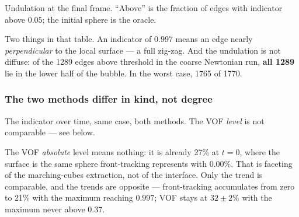 \begin{table}[htbp]
\centering
\caption{Undulation at the final frame. ``Above'' is the fraction of edges with
indicator above $0.05$; the initial sphere is the oracle.}
\label{tab:undulation}
\small
\begin{adjustbox}{max width=\linewidth}
\end{adjustbox}
\end{table}

Two things in that table. An indicator of $0.997$ means an edge nearly
\emph{perpendicular} to the local surface --- a full zig-zag. And the undulation
is not diffuse: of the 1289 edges above threshold in the coarse Newtonian run,
\textbf{all 1289} lie in the lower half of the bubble. In the worst case, 1765
of 1770.

\subsubsection{The two methods differ in kind, not degree}

\begin{table}[htbp]
\centering
\caption{The indicator over time, same case, both methods. The VOF
\emph{level} is not comparable --- see below.}
\label{tab:undtime}
\small
{}
\end{table}

The VOF \emph{absolute} level means nothing: it is already 27\% at $t=0$, where
the surface is the same sphere front-tracking represents with $0.00\%$. That is
faceting of the marching-cubes extraction, not of the interface. Only the trend
is comparable, and the trends are opposite --- front-tracking accumulates from
zero to 21\% with the maximum reaching $0.997$; VOF stays at $32\pm2\%$ with the
maximum never above $0.37$.

